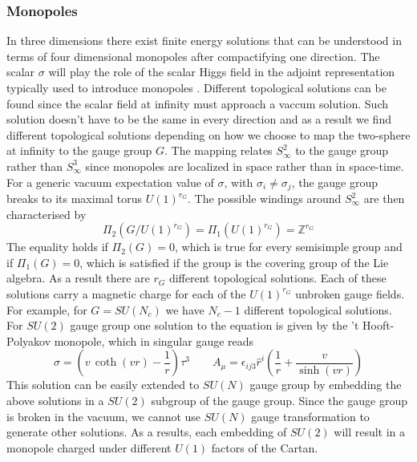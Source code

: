  
\subsubsection{Monopoles}
In three dimensions there exist finite energy solutions that can be understood in terms of four dimensional monopoles after compactifying one direction.
The scalar $\sigma$ will play the role of the scalar Higgs field in the adjoint representation typically used to introduce monopoles \cite{Weinberg:2006rq}.
Different topological solutions can be found since the scalar field at infinity must approach a vaccum solution.
Such solution doesn't have to be the same in every direction and as a result we find different topological solutions depending on how we choose to map the two-sphere at infinity to the gauge group $G$.
The mapping relates $S^2_{\infty}$ to the gauge group rather than $S^3_{\infty}$ since monopoles are localized in space rather than in space-time.\\
For a generic vacuum expectation value of $\sigma$, with $\sigma_i \neq \sigma_j$, the gauge group breaks to its maximal torus $U(1)^{r_G}$.
The possible windings around $S^2_{\infty}$ are then characterised by
\begin{equation}
 \Pi_{2} \left( G / U(1)^{r_G} \right) = \Pi_1 (U(1)^{r_G}) = \mathbb{Z}^{r_G}
\end{equation}
The equality holds if $\Pi_2(G) = 0$, which is true for every semisimple group and if $\Pi_1(G) = 0$, which is satisfied if the group is the covering group of the Lie algebra.
As a result there are $r_G$ different topological solutions.
Each of these solutions carry a magnetic charge for each of the $U(1)^{r_G}$ unbroken gauge fields. 
For example, for $G= SU(N_c)$ we have $N_c-1$ different topological solutions.
\\
For $SU(2)$ gauge group one solution to the equation is given by the 't Hooft-Polyakov monopole, which in singular gauge reads \cite{Csaki:2014cwa}
\begin{equation}
  \sigma = \left( v \, \coth (v r) - \frac{1}{r} \right)  \tau^3 \qquad A_{\mu} = \epsilon_{i j 3} \hat{r}^i \left( \frac{1}{r} + \frac{v}{\sinh (vr)} \right)
\end{equation}
This solution can be easily extended to $SU(N)$ gauge group by embedding the above solutions in a $SU(2)$ subgroup of the gauge group.
Since the gauge group is broken in the vacuum, we cannot use $SU(N)$ gauge transformation to generate other solutions.
As a results, each embedding of $SU(2)$ will result in a monopole charged under different $U(1)$ factors of the Cartan. 
